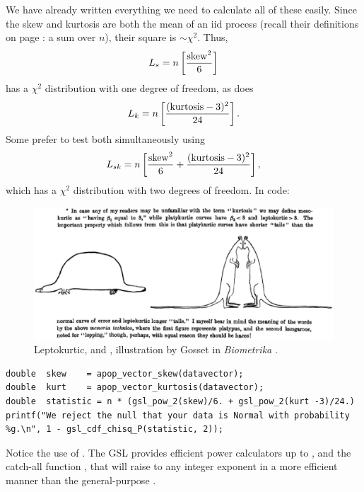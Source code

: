 We have already written everything we need to calculate all of these easily.
Since the skew and kurtosis are both the mean of an iid process (recall
their definitions on page \pageref{kurtskew}: a sum over $n$), their
square is $\sim \chi^2$. Thus,
$$L_s = n\left[{{\rm skew}^2\over 6}\right]$$
has a $\chi^2$ distribution with one degree of freedom, as does
$$L_k = n\left[{({\rm kurtosis}-3)^2\over 24}\right].$$
Some prefer to test both simultaneously using
$$L_{sk} = n\left[{{\rm skew}^2\over 6} + {({\rm kurtosis}-3)^2\over 24}\right],$$
which has a $\chi^2$ distribution with two degrees of freedom. In code:

\begin{figure}[tb]
\hspace{-.3in}\includegraphics[width=\textwidth*\real{1.1}]{kurtosis.eps}
\caption{Leptokurtic,  and , illustration by Gosset in {\em Biometrika} \citep[p 160]{student:errors}. }
\label{tailfig}
\end{figure}


\begin{lstlisting}
double  skew    = apop_vector_skew(datavector);
double  kurt    = apop_vector_kurtosis(datavector);
double  statistic = n * (gsl_pow_2(skew)/6. + gsl_pow_2(kurt -3)/24.)
printf("We reject the null that your data is Normal with probability %g.\n", 1 - gsl_cdf_chisq_P(statistic, 2));
\end{lstlisting}

Notice the use of . The GSL provides efficient
power calculators up to , and the catch-all function
, that will raise
 to any integer exponent in a more efficient manner than the
general-purpose .

